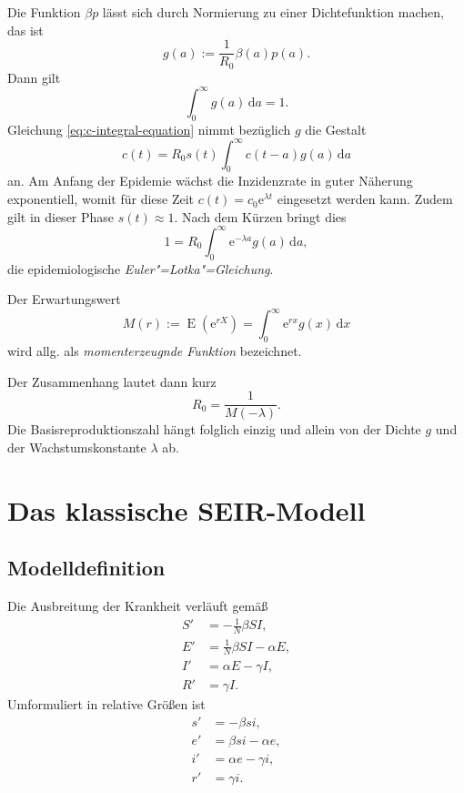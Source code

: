 \documentclass[a4paper,10pt,fleqn,twocolumn,twoside,dvipdfmx]{scrartcl}
\numberwithin{equation}{section}
\newcommand{\ee}{\mathrm e}
\begin{document}
Die Funktion $\beta p$ lässt sich durch Normierung zu einer
Dichtefunktion machen, das ist%
\begin{equation}
g(a) := \frac{1}{R_0} \beta(a)p(a).
\end{equation}
Dann gilt
\begin{equation}
\int_0^\infty g(a)\,\mathrm da = 1.
\end{equation}
Gleichung \eqref{eq:c-integral-equation} nimmt bezüglich
$g$ die Gestalt%
\begin{equation}
c(t) = R_0s(t)\int_0^\infty c(t-a)g(a)\,\mathrm da
\end{equation}
an. Am Anfang der Epidemie wächst die Inzidenzrate in guter Näherung
exponentiell, womit für diese Zeit $c(t)=c_0\ee^{\lambda t}$
eingesetzt werden kann. Zudem gilt in dieser Phase $s(t)\approx 1$.
Nach dem Kürzen bringt dies%
\begin{equation}
1 = R_0\int_0^\infty \ee^{-\lambda a}g(a)\,\mathrm da,
\end{equation}
die epidemiologische \emph{Euler"=Lotka"=Gleichung}.

Der Erwartungswert
\begin{equation}
M(r) := \operatorname{E}(\ee^{rX})
= \int_0^\infty \ee^{rx}g(x)\,\mathrm dx
\end{equation}
wird allg. als \emph{momenterzeugnde Funktion} bezeichnet.

Der Zusammenhang lautet dann kurz
\begin{equation}
R_0 = \frac{1}{M(-\lambda)}.
\end{equation}
Die Basisreproduktionszahl hängt folglich einzig und allein von
der Dichte $g$ und der Wachstumskonstante $\lambda$ ab.


\section{Das klassische SEIR-Modell}

\subsection{Modelldefinition}
Die Ausbreitung der Krankheit verläuft gemäß%
\begin{align}
S' &= -\tfrac{1}{N} \beta SI,\\
E' &= \tfrac{1}{N} \beta SI - \alpha E,\\
I' &= \alpha E - \gamma I,\\
R' &= \gamma I.
\end{align}
Umformuliert in relative Größen ist
\begin{align}
\label{eq:seir-s} s' &= - \beta si,\\
\label{eq:seir-e} e' &= \beta si - \alpha e,\\
\label{eq:seir-i} i' &= \alpha e - \gamma i,\\
\label{eq:seir-r} r' &= \gamma i.
\end{align}
\end{document}
